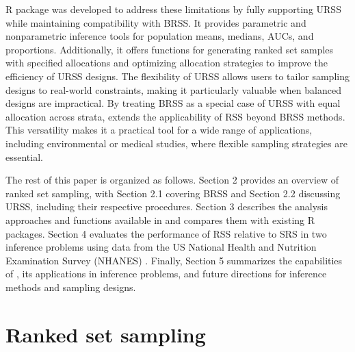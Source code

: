 R package  \citep{generalRSS} was developed to address these limitations by fully supporting URSS while maintaining compatibility with BRSS. It provides parametric and nonparametric inference tools for population means, medians, AUCs, and proportions. Additionally, it offers functions for generating ranked set samples with specified allocations and optimizing allocation strategies to improve the efficiency of URSS designs. The flexibility of URSS allows users to tailor sampling designs to real-world constraints, making it particularly valuable when balanced designs are impractical. By treating BRSS as a special case of URSS with equal allocation across strata,  extends the applicability of RSS beyond BRSS methods. This versatility makes it a practical tool for a wide range of applications, including environmental or medical studies, where flexible sampling strategies are essential.

The rest of this paper is organized as follows. Section 2 provides an overview of ranked set sampling, with Section 2.1 covering BRSS and Section 2.2 discussing URSS, including their respective procedures. Section 3 describes the analysis approaches and functions available in  and compares them with existing R packages. Section 4 evaluates the performance of RSS relative to SRS in two inference problems using data from the US National Health and Nutrition Examination Survey (NHANES) \citep{NHANES,centers2023national}. Finally, Section 5 summarizes the capabilities of , its applications in inference problems, and future directions for inference methods and sampling designs.



\section{Ranked set sampling} \label{sec:rss}

